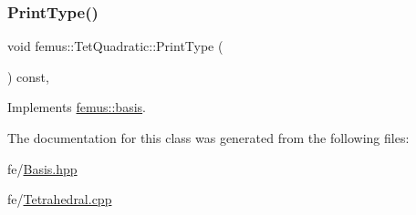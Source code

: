 \mbox{\label{classfemus_1_1_tet_quadratic_a64b7e71b4a3e9afb5e129313153dfbe4}} 
\subsubsection{\texorpdfstring{Print\+Type()}{PrintType()}}
{\footnotesize\ttfamily void femus\+::\+Tet\+Quadratic\+::\+Print\+Type (\begin{DoxyParamCaption}{ }\end{DoxyParamCaption}) const\hspace{0.3cm}{\ttfamily [inline]}, {\ttfamily [virtual]}}



Implements \mbox{\hyperlink{classfemus_1_1basis_abbae7bf8f31ec5793c911bc6d4ea0572}{femus\+::basis}}.



The documentation for this class was generated from the following files\+:\begin{DoxyCompactItemize}
\item 
fe/\mbox{\hyperlink{_basis_8hpp}{Basis.\+hpp}}\item 
fe/\mbox{\hyperlink{_tetrahedral_8cpp}{Tetrahedral.\+cpp}}\end{DoxyCompactItemize}
